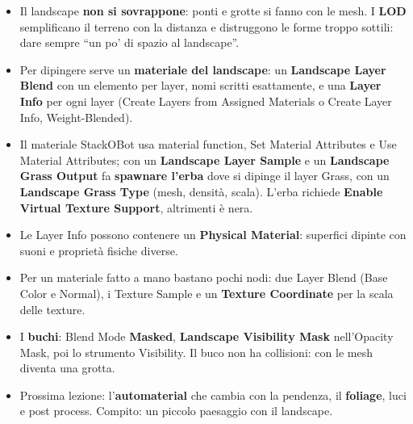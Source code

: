 \begin{itemize}
        (Both, Raise, Lower, Use Slope Flatten: plateau, scaloni, canyon), Ramp (rampe e
        dighe, non ponti sospesi), Erosion e Hydro (poco controllabili), Noise, Mirror,
        Copy/Paste con Paste Mode.
  \item Il landscape \textbf{non si sovrappone}: ponti e grotte si fanno con le mesh. I
        \textbf{LOD} semplificano il terreno con la distanza e distruggono le forme troppo
        sottili: dare sempre ``un po' di spazio al landscape''.
  \item Per dipingere serve un \textbf{materiale del landscape}: un \textbf{Landscape Layer
        Blend} con un elemento per layer, nomi scritti esattamente, e una \textbf{Layer Info}
        per ogni layer (Create Layers from Assigned Materials o Create Layer Info,
        Weight-Blended).
  \item Il materiale StackOBot usa material function, Set Material Attributes e Use Material
        Attributes; con un \textbf{Landscape Layer Sample} e un \textbf{Landscape Grass
        Output} fa \textbf{spawnare l'erba} dove si dipinge il layer Grass, con un
        \textbf{Landscape Grass Type} (mesh, densità, scala). L'erba richiede
        \textbf{Enable Virtual Texture Support}, altrimenti è nera.
  \item Le Layer Info possono contenere un \textbf{Physical Material}: superfici dipinte con
        suoni e proprietà fisiche diverse.
  \item Per un materiale fatto a mano bastano pochi nodi: due Layer Blend (Base Color e Normal),
        i Texture Sample e un \textbf{Texture Coordinate} per la scala delle texture.
  \item I \textbf{buchi}: Blend Mode \textbf{Masked}, \textbf{Landscape Visibility Mask}
        nell'Opacity Mask, poi lo strumento Visibility. Il buco non ha collisioni: con le
        mesh diventa una grotta.
  \item Prossima lezione: l'\textbf{automaterial} che cambia con la pendenza, il
        \textbf{foliage}, luci e post process. Compito: un piccolo paesaggio con il
        landscape.
\end{itemize}
